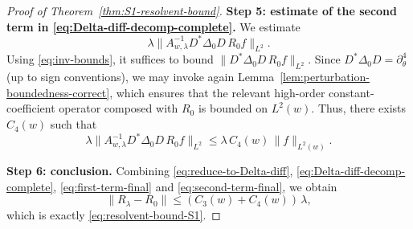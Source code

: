 \documentclass{amsart}
\numberwithin{equation}{section}
\theoremstyle{definition}
\theoremstyle{remark}
\begin{document}
\begin{proof}[Proof of Theorem~\ref{thm:S1-resolvent-bound}]
\medskip
\noindent\textbf{Step 5: estimate of the second term in \eqref{eq:Delta-diff-decomp-complete}.}
We estimate
\[
\lambda\|A_{w,\lambda}^{-1}D^*\Delta_0D\,R_0 f\|_{L^2}.
\]
Using \eqref{eq:inv-bounds}, it suffices to bound $\|D^*\Delta_0D\,R_0 f\|_{L^2}$.
Since $D^*\Delta_0D=\partial_\theta^4$ (up to sign conventions),
we may invoke again Lemma~\ref{lem:perturbation-boundedness-correct}, which ensures that the relevant
high-order constant-coefficient operator composed with $R_0$ is bounded on $L^2(w)$.
Thus, there exists $C_4(w)$ such that
\begin{equation}\label{eq:second-term-final}
\lambda\|A_{w,\lambda}^{-1}D^*\Delta_0D\,R_0 f\|_{L^2}
\le
\lambda\,C_4(w)\,\|f\|_{L^2(w)}.
\end{equation}

\medskip
\noindent\textbf{Step 6: conclusion.}
Combining \eqref{eq:reduce-to-Delta-diff}, \eqref{eq:Delta-diff-decomp-complete},
\eqref{eq:first-term-final} and \eqref{eq:second-term-final}, we obtain
\[
\|R_\lambda-R_0\|
\le
(C_3(w)+C_4(w))\,\lambda,
\]
which is exactly \eqref{eq:resolvent-bound-S1}.
\end{proof}
\end{document}
